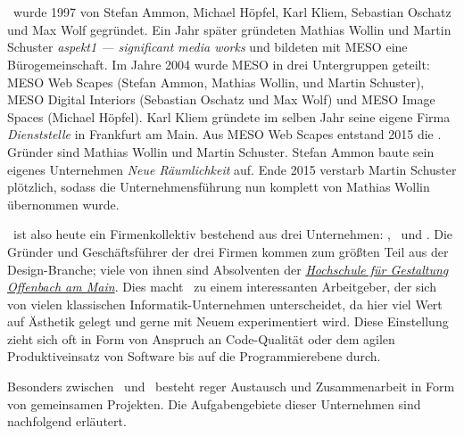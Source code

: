 \section{\meso}
\label{sec:e_meso}

\meso~wurde 1997 von Stefan Ammon, Michael Höpfel, Karl Kliem, Sebastian
Oschatz und Max Wolf gegründet. Ein Jahr später gründeten Mathias Wollin und
Martin Schuster \emph{aspekt1 --- significant media works} und bildeten mit
MESO eine Bürogemeinschaft.  Im Jahre 2004 wurde MESO in drei Untergruppen
geteilt: MESO Web Scapes (Stefan Ammon, Mathias Wollin, und Martin Schuster),
MESO Digital Interiors (Sebastian Oschatz und Max Wolf) und MESO Image Spaces
(Michael Höpfel). Karl Kliem gründete im selben Jahr seine eigene Firma
\emph{Dienststelle} in Frankfurt am Main.  Aus MESO Web Scapes entstand 2015
die \mesods. Gründer sind  Mathias Wollin und Martin Schuster.  Stefan Ammon
baute sein eigenes Unternehmen \emph{Neue Räumlichkeit} auf.  Ende 2015
verstarb Martin Schuster plötzlich, sodass die Unternehmensführung nun komplett
von Mathias Wollin übernommen wurde.

\meso~ist also heute ein Firmenkollektiv bestehend aus drei Unternehmen:
\mesodi, \mesods~und \mesois.  Die Gründer und Geschäftsführer der drei Firmen
kommen zum größten Teil aus der Design-Branche; viele von ihnen sind Absolventen
der \emph{\href{http://hfg-offenbach.de}{Hochschule für Gestaltung Offenbach am
Main}}.  Dies macht \meso~zu einem interessanten Arbeitgeber, der sich von
vielen klassischen Informatik-Unternehmen unterscheidet, da hier viel Wert auf
Ästhetik gelegt und gerne mit Neuem experimentiert wird.  Diese Einstellung
zieht sich oft in Form von Anspruch an Code-Qualität oder dem agilen
Produktiveinsatz von Software bis auf die Programmierebene durch.

Besonders zwischen \mesodi~und \mesods~besteht reger Austausch und
Zusammenarbeit in Form von gemeinsamen Projekten.  Die Aufgabengebiete dieser
Unternehmen sind nachfolgend erläutert.



